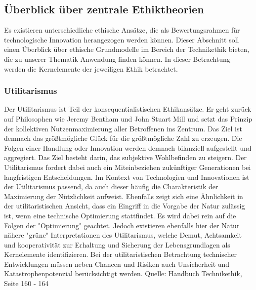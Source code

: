 \subsection{Überblick über zentrale Ethiktheorien}

Es existieren unterschiedliche ethische Ansätze, die als Bewertungsrahmen für technologische Innovation herangezogen werden können. Dieser Abschnitt soll einen Überblick über ethische Grundmodelle im Bereich der Technikethik bieten, die zu unserer Thematik Anwendung finden können. In dieser Betrachtung werden die Kernelemente der jeweiligen Ethik betrachtet.

\subsubsection{Utilitarismus}
Der Utilitarismus ist Teil der konsequentialistischen Ethikansätze. Er geht zurück auf Philosophen wie Jeremy Bentham und John Stuart Mill und setzt das Prinzip der kollektiven Nutzenmaximierung aller Betroffenen ins Zentrum. Das Ziel ist demnach das größtmögliche Glück für die größtmögliche Zahl zu erzeugen. Die Folgen einer Handlung oder Innovation werden demnach bilanziell aufgestellt und aggregiert. Das Ziel besteht darin, das subjektive Wohlbefinden zu steigern. Der Utilitarismus fordert dabei auch ein Miteinbeziehen zukünftiger Generationen bei langfristigen Entscheidungen. Im Kontext von Technologien und Innovationen ist der Utilitarismus passend, da auch dieser häufig die Charakteristik der Maximierung der Nützlichkeit aufweist. Ebenfalls zeigt sich eine Ähnlichkeit in der utilitaristischen Ansicht, dass ein Eingriff in die Vorgabe der Natur zulässig ist, wenn eine technische Optimierung stattfindet. Es wird dabei rein auf die Folgen der "Optimierung" geachtet.  Jedoch existieren ebenfalls hier der Natur nähere "grüne"  Interpretationen des Utilitarismus, welche Demut, Achtsamkeit und kooperativität zur Erhaltung und Sicherung der Lebensgrundlagen als Kernelemente identifizieren. Bei der utilitaristischen Betrachtung technischer Entwicklungen müssen neben Chancen und Risiken auch Unsicherheit und Katastrophenpotenzial berücksichtigt werden. \cite{}
Quelle: Handbuch Technikethik, Seite 160 - 164

